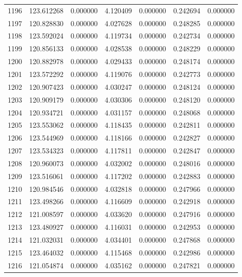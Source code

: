 \begin{tabular}{rrrrrrr}
1196 & 123.612268 &    0.000000 &  4.120409 &    0.000000 &    0.242694 &  0.000000 \\
1197 & 120.828830 &    0.000000 &  4.027628 &    0.000000 &    0.248285 &  0.000000 \\
1198 & 123.592024 &    0.000000 &  4.119734 &    0.000000 &    0.242734 &  0.000000 \\
1199 & 120.856133 &    0.000000 &  4.028538 &    0.000000 &    0.248229 &  0.000000 \\
1200 & 120.882978 &    0.000000 &  4.029433 &    0.000000 &    0.248174 &  0.000000 \\
1201 & 123.572292 &    0.000000 &  4.119076 &    0.000000 &    0.242773 &  0.000000 \\
1202 & 120.907423 &    0.000000 &  4.030247 &    0.000000 &    0.248124 &  0.000000 \\
1203 & 120.909179 &    0.000000 &  4.030306 &    0.000000 &    0.248120 &  0.000000 \\
1204 & 120.934721 &    0.000000 &  4.031157 &    0.000000 &    0.248068 &  0.000000 \\
1205 & 123.553062 &    0.000000 &  4.118435 &    0.000000 &    0.242811 &  0.000000 \\
1206 & 123.544969 &    0.000000 &  4.118166 &    0.000000 &    0.242827 &  0.000000 \\
1207 & 123.534323 &    0.000000 &  4.117811 &    0.000000 &    0.242847 &  0.000000 \\
1208 & 120.960073 &    0.000000 &  4.032002 &    0.000000 &    0.248016 &  0.000000 \\
1209 & 123.516061 &    0.000000 &  4.117202 &    0.000000 &    0.242883 &  0.000000 \\
1210 & 120.984546 &    0.000000 &  4.032818 &    0.000000 &    0.247966 &  0.000000 \\
1211 & 123.498266 &    0.000000 &  4.116609 &    0.000000 &    0.242918 &  0.000000 \\
1212 & 121.008597 &    0.000000 &  4.033620 &    0.000000 &    0.247916 &  0.000000 \\
1213 & 123.480927 &    0.000000 &  4.116031 &    0.000000 &    0.242953 &  0.000000 \\
1214 & 121.032031 &    0.000000 &  4.034401 &    0.000000 &    0.247868 &  0.000000 \\
1215 & 123.464032 &    0.000000 &  4.115468 &    0.000000 &    0.242986 &  0.000000 \\
1216 & 121.054874 &    0.000000 &  4.035162 &    0.000000 &    0.247821 &  0.000000 \\

\end{tabular}
